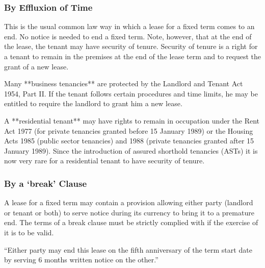 \documentclass[
]{article}
\newenvironment{Shaded}{}{}
\newcommand{\NormalTok}[1]{#1}
\begin{document}
\hypertarget{by-effluxion-of-time}{%
\subsubsection{By Effluxion of Time}\label{by-effluxion-of-time}}

This is the usual common law way in which a lease for a fixed term comes
to an end. No notice is needed to end a fixed term. Note, however, that
at the end of the lease, the tenant may have security of tenure.
Security of tenure is a right for a tenant to remain in the premises at
the end of the lease term and to request the grant of a new lease.

\begin{Shaded}
\begin{Highlighting}[]
\NormalTok{Many **business tenancies** are protected by the Landlord and Tenant Act 1954, Part II. If the tenant follows certain procedures and time limits, he may be entitled to require the landlord to grant him a new lease.}

\NormalTok{A **residential tenant** may have rights to remain in occupation under the Rent Act 1977 (for private tenancies granted before 15 January 1989) or the Housing Acts 1985 (public sector tenancies) and 1988 (private tenancies granted after 15 January 1989). Since the introduction of assured shorthold tenancies (ASTs) it is now very rare for a residential tenant to have security of tenure.}
\end{Highlighting}
\end{Shaded}

\hypertarget{by-a-break-clause}{%
\subsubsection{By a `break' Clause}\label{by-a-break-clause}}

A lease for a fixed term may contain a provision allowing either party
(landlord or tenant or both) to serve notice during its currency to
bring it to a premature end. The terms of a break clause must be
strictly complied with if the exercise of it is to be valid.

\begin{Shaded}
\begin{Highlighting}[]
\NormalTok{“Either party may end this lease on the fifth anniversary of the term start date by serving 6 months written notice on the other.”}
\end{Highlighting}
\end{Shaded}
\end{document}
